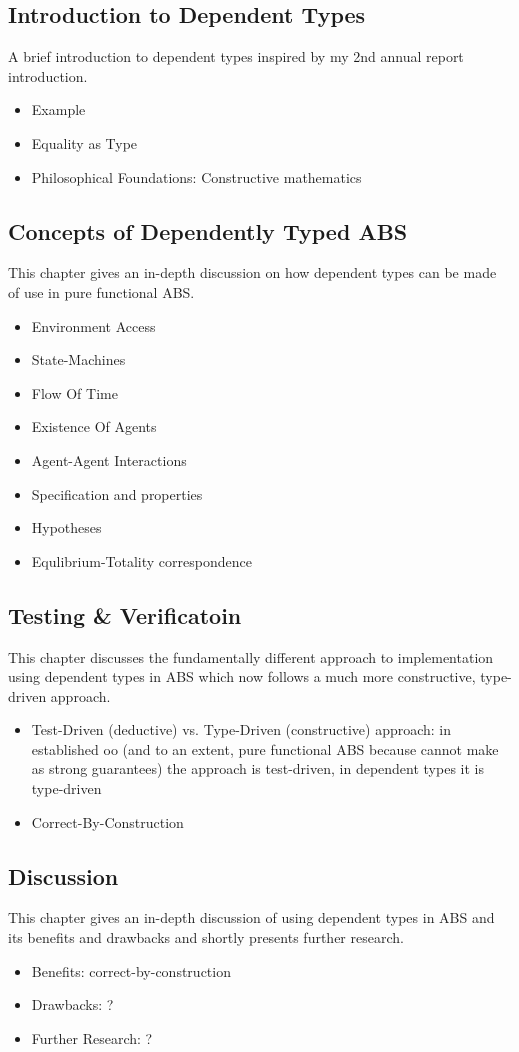 \subsection{Introduction to Dependent Types}
A brief introduction to dependent types inspired by my 2nd annual report introduction.
\begin{itemize}
	\item Example
	\item Equality as Type
	\item Philosophical Foundations: Constructive mathematics
\end{itemize}

\subsection{Concepts of Dependently Typed ABS}
This chapter gives an in-depth discussion on how dependent types can be made of use in pure functional ABS.
\begin{itemize}
	\item Environment Access
	\item State-Machines
	\item Flow Of Time
	\item Existence Of Agents
	\item Agent-Agent Interactions
	\item Specification and properties
	\item Hypotheses
	\item Equlibrium-Totality correspondence
\end{itemize}

\subsection{Testing \& Verificatoin}
This chapter discusses the fundamentally different approach to implementation using dependent types in ABS which now follows a much more constructive, type-driven approach.
\begin{itemize}
	\item Test-Driven (deductive) vs. Type-Driven (constructive) approach: in established oo (and to an extent, pure functional ABS because cannot make as strong guarantees) the approach is test-driven, in dependent types it is type-driven
	\item Correct-By-Construction
\end{itemize}

\subsection{Discussion}
This chapter gives an in-depth discussion of using dependent types in ABS and its benefits and drawbacks and shortly presents further research.
\begin{itemize}
	\item Benefits: correct-by-construction
	\item Drawbacks: ?
	\item Further Research: ?
\end{itemize}


